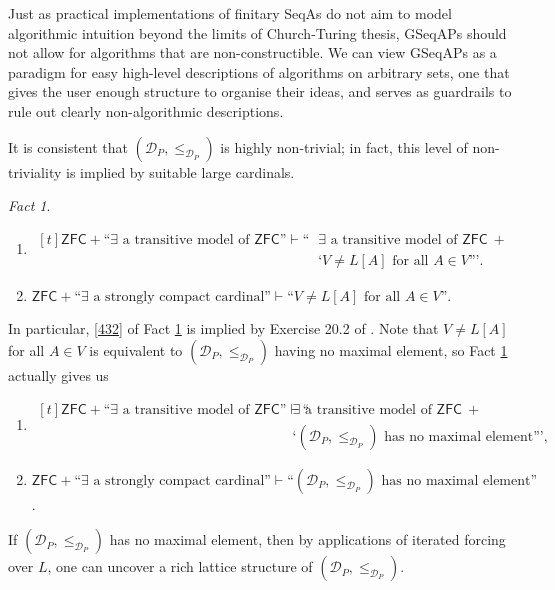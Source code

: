 \documentclass[12pt, twoside]{memoir}
\numberwithin{equation}{section}
\theoremstyle{definition}
\theoremstyle{remark}
\newtheorem{fact}[thm]{Fact}
\theoremstyle{definition}
\theoremstyle{definition}
\theoremstyle{definition}
\theoremstyle{remark}
\begin{document}
Just as practical implementations of finitary SeqAs do not aim to model algorithmic intuition beyond the limits of Church-Turing thesis, GSeqAPs should not allow for algorithms that are non-constructible. We can view GSeqAPs as a paradigm for easy high-level descriptions of algorithms on arbitrary sets, one that gives the user enough structure to organise their ideas, and serves as guardrails to rule out clearly non-algorithmic descriptions.

It is consistent that $(\mathcal{D}_P, \leq_{\mathcal{D}_P})$ is highly non-trivial; in fact, this level of non-triviality is implied by suitable large cardinals.

\begin{fact}\label{fact284}
\leavevmode
\begin{enumerate}[label=(\arabic*)]
    \item 
    \!
    $\begin{aligned}[t]
        \mathsf{ZFC} + \text{``} \exists \text{ a transitive model of } \mathsf{ZFC} \text{''} \vdash \text{``} & \exists \text{ a transitive model of } \mathsf{ZFC} \ + \\
        & \text{`} V \neq L[A] \text{ for all } A \in V \text{'''.}
    \end{aligned}$
    \item\label{432} $\mathsf{ZFC} + \text{``} \exists \text{ a strongly compact cardinal''} \vdash \text{``} V \neq L[A] \text{ for all } A \in V \text{''}$.
\end{enumerate}
\end{fact}

In particular, \ref{432} of Fact \ref{fact284} is implied by Exercise 20.2 of \cite{jech}. Note that $V \neq L[A]$ for all $A \in V$ is equivalent to $(\mathcal{D}_P, \leq_{\mathcal{D}_P})$ having no maximal element, so Fact \ref{fact284} actually gives us

\begin{enumerate}[label=(E\arabic*)]
    \item\label{e1}
    \!
    $\begin{aligned}[t]
        \mathsf{ZFC} + \text{``} \exists \text{ a transitive model of } \mathsf{ZFC} \text{''} \vdash \text{``} & \exists \text{ a transitive model of } \mathsf{ZFC} \ + \\
        & \text{`} (\mathcal{D}_P, \leq_{\mathcal{D}_P}) \text{ has no maximal element''',}
    \end{aligned}$
    \item $\mathsf{ZFC} + \text{``} \exists \text{ a strongly compact cardinal''} \vdash \text{``} (\mathcal{D}_P, \leq_{\mathcal{D}_P}) \text{ has no maximal element''}$.
\end{enumerate}
If $(\mathcal{D}_P, \leq_{\mathcal{D}_P})$ has no maximal element, then by applications of iterated forcing over $L$, one can uncover a rich lattice structure of $(\mathcal{D}_P, \leq_{\mathcal{D}_P})$.
\end{document}
